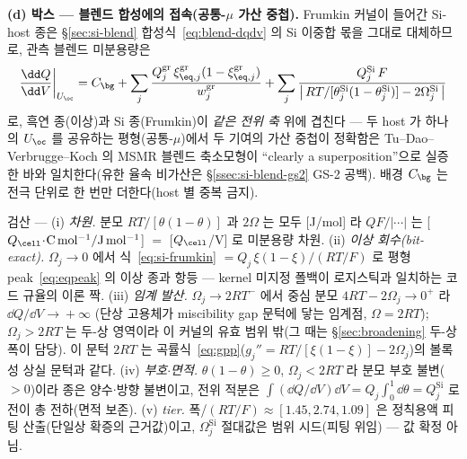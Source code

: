 \textbf{(d) 박스 --- 블렌드 합성에의 접속(공통-$\mu$ 가산 중첩).} Frumkin 커널이 들어간 Si-host 종은
\S\ref{sec:si-blend} 합성식~\eqref{eq:blend-dqdv} 의 Si 이중합 몫을 그대로 대체하므로, 관측 블렌드 미분용량은
\begin{equation}
\frac{\dd Q}{\dd V}\bigg|_{U_\oc}=C_\bg
+\sum_{j}\frac{Q_j^\mathrm{gr}\,\xi_{\eq,j}^\mathrm{gr}(1-\xi_{\eq,j}^\mathrm{gr})}{w_j^\mathrm{gr}}
+\sum_{j}\frac{Q_j^\mathrm{Si}\,F}{\big|\,RT/[\theta_j^\mathrm{Si}(1-\theta_j^\mathrm{Si})]-2\Omega_j^\mathrm{Si}\,\big|}
\label{eq:si-frumkin-blend}
\end{equation}
로, 흑연 종(이상)과 Si 종(Frumkin)이 \emph{같은 전위 축} 위에 겹친다 --- 두 host 가 하나의 $U_\oc$ 를 공유하는
평형(공통-$\mu$)에서 두 기여의 가산 중첩이 정확함은 Tu--Dao--Verbrugge--Koch 의 MSMR 블렌드 축소모형이
``clearly a superposition''으로 실증한 바와 일치한다\cite{tu_blend2024}(유한 율속 비가산은 \S\ref{ssec:si-blend-gs2}
GS-2 공백). 배경 $C_\bg$ 는 전극 단위로 한 번만 더한다(host 별 중복 금지).
\begin{verifybox}
검산 --- (i) \emph{차원.} 분모 $RT/[\theta(1-\theta)]$ 과 $2\Omega$ 는 모두 [J/mol] 라 $QF/|\cdots|$ 는
[$Q_\cell\!\cdot\!\mathrm{C\,mol^{-1}}/\mathrm{J\,mol^{-1}}$] $=$ [$Q_\cell$/V] 로 미분용량 차원. (ii) \emph{이상
회수(bit-exact).} $\Omega_j\!\to\!0$ 에서 식~\eqref{eq:si-frumkin} $=Q_j\,\xi(1-\xi)/(RT/F)$ 로 평형
peak~\eqref{eq:eqpeak} 의 이상 종과 항등 --- kernel 미지정 폴백이 로지스틱과 일치하는 코드 규율의 이론 짝.
(iii) \emph{임계 발산.} $\Omega_j\!\to\!2RT^-$ 에서 중심 분모 $4RT-2\Omega_j\!\to\!0^+$ 라 $\dd Q/\dd V\!\to\!+\infty$
(단상 고용체가 miscibility gap 문턱에 닿는 임계점, $\Omega\!=\!2RT$); $\Omega_j\!>\!2RT$
는 두-상 영역이라 이 커널의 유효 범위 밖(그 때는 \S\ref{sec:broadening} 두-상 폭이 담당). 이 문턱 $2RT$ 는
곡률식~\eqref{eq:gpp}($g_j''\!=\!RT/[\xi(1-\xi)]-2\Omega_j$)의 볼록성 상실 문턱과 같다. (iv) \emph{부호$\cdot$면적.}
$\theta(1-\theta)\!\ge\!0$, $\Omega_j\!<\!2RT$ 라 분모 부호 불변($>\!0$)이라 종은 양수$\cdot$방향 불변이고, 전위
적분은 $\int(\dd Q/\dd V)\dd V=Q_j\!\int_0^1\dd\theta=Q_j^\mathrm{Si}$ 로 전이 총 전하(면적 보존).
(v) \emph{tier.} 폭/$(RT/F)\!\approx\![1.45,2.74,1.09]$ 은 정칙용액 피팅 산출(단일상 확증의 근거값)이고,
$\Omega_j^\mathrm{Si}$ 절대값은 범위 시드(피팅 위임) --- 값 확정 아님.
\end{verifybox}

